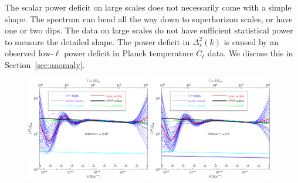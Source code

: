 \documentclass[11pt]{article}
\def \halffigwidth{0.48\textwidth}
\begin{document}
The scalar power deficit on large scales does not necessarily come with a simple shape. The spectrum can bend all the way down to superhorizon scales, or have one or two dips. The data on large scales do not have sufficient statistical power to measure the detailed shape. The power deficit in $\Delta_s^2(k)$ is caused by an observed low-$\ell$ power deficit in Planck temperature $C_\ell$ data. We discuss this in Section~\ref{sec:anomaly}.

\begin{figure}
  \includegraphics[width=\halffigwidth]{nobicep_spline0_p11_r0d02_power_traj.pdf}%
  \includegraphics[width=\halffigwidth]{nobicep_spline0_p11_r0d1_power_traj.pdf}

\end{figure}
\end{document}
